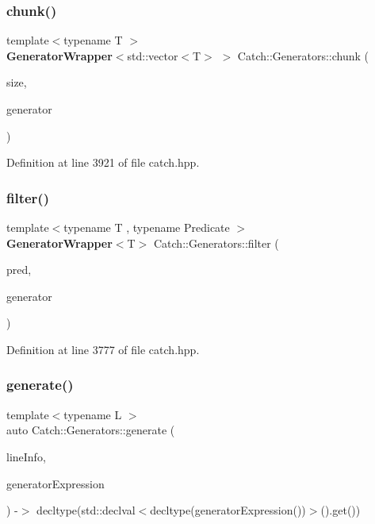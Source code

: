 \mbox{\label{namespace_catch_1_1_generators_a0ac5eeee0354973c318f62d0937a7981}} 
\subsubsection{chunk()}
{\footnotesize\ttfamily template$<$typename T $>$ \\
\textbf{ Generator\+Wrapper}$<$std\+::vector$<$T$>$ $>$ Catch\+::\+Generators\+::chunk (\begin{DoxyParamCaption}\item[{size\+\_\+t}]{size,  }\item[{\textbf{ Generator\+Wrapper}$<$ T $>$ \&\&}]{generator }\end{DoxyParamCaption})}



Definition at line 3921 of file catch.\+hpp.

\mbox{\label{namespace_catch_1_1_generators_afd87f4cbf259f2252aee164d6905b18b}} 
\subsubsection{filter()}
{\footnotesize\ttfamily template$<$typename T , typename Predicate $>$ \\
\textbf{ Generator\+Wrapper}$<$T$>$ Catch\+::\+Generators\+::filter (\begin{DoxyParamCaption}\item[{Predicate \&\&}]{pred,  }\item[{\textbf{ Generator\+Wrapper}$<$ T $>$ \&\&}]{generator }\end{DoxyParamCaption})}



Definition at line 3777 of file catch.\+hpp.

\mbox{\label{namespace_catch_1_1_generators_adbda9e2d18cd3e4dbb124c7d8830c97b}} 
\subsubsection{generate()}
{\footnotesize\ttfamily template$<$typename L $>$ \\
auto Catch\+::\+Generators\+::generate (\begin{DoxyParamCaption}\item[{\textbf{ Source\+Line\+Info} const \&}]{line\+Info,  }\item[{L const \&}]{generator\+Expression }\end{DoxyParamCaption}) -\/$>$ decltype(std\+::declval$<$decltype(generator\+Expression())$>$().get()) }



